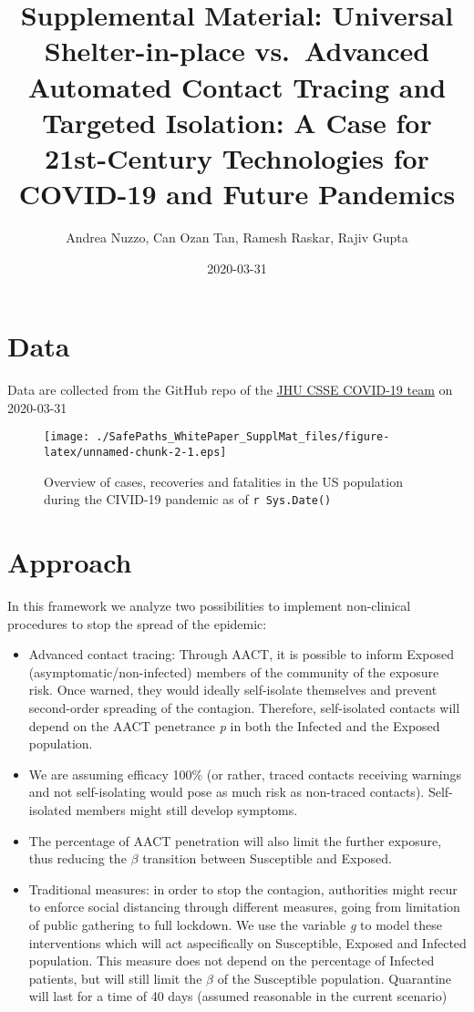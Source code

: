 \documentclass[]{article}
\title{Supplemental Material: Universal Shelter-in-place vs.~Advanced
Automated Contact Tracing and Targeted Isolation: A Case for
21st-Century Technologies for COVID-19 and Future Pandemics}
\author{Andrea Nuzzo, Can Ozan Tan, Ramesh Raskar, Rajiv Gupta}
\date{2020-03-31}
\begin{document}
\maketitle

\hypertarget{data}{%
\section{Data}\label{data}}

Data are collected from the GitHub repo of the
\href{https://doi.org/10.1016/S1473-3099(20)30120-1}{JHU CSSE COVID-19
team} on 2020-03-31

\begin{figure}
\centering
\texttt{[image: ./SafePaths\_WhitePaper\_SupplMat\_files/figure-latex/unnamed-chunk-2-1.eps]}
\caption{Overview of cases, recoveries and fatalities in the US
population during the CIVID-19 pandemic as of \texttt{r\ Sys.Date()}}
\end{figure}

\hypertarget{approach}{%
\section{Approach}\label{approach}}

In this framework we analyze two possibilities to implement non-clinical
procedures to stop the spread of the epidemic:

\begin{itemize}
\item
  Advanced contact tracing: Through AACT, it is possible to inform
  Exposed (asymptomatic/non-infected) members of the community of the
  exposure risk. Once warned, they would ideally self-isolate themselves
  and prevent second-order spreading of the contagion. Therefore,
  self-isolated contacts will depend on the AACT penetrance \emph{p} in
  both the Infected and the Exposed population.
\item
  We are assuming efficacy 100\% (or rather, traced contacts receiving
  warnings and not self-isolating would pose as much risk as non-traced
  contacts). Self-isolated members might still develop symptoms.
\item
  The percentage of AACT penetration will also limit the further
  exposure, thus reducing the \(\beta\) transition between Susceptible
  and Exposed.
\item
  Traditional measures: in order to stop the contagion, authorities
  might recur to enforce social distancing through different measures,
  going from limitation of public gathering to full lockdown. We use the
  variable \emph{g} to model these interventions which will act
  aspecifically on Susceptible, Exposed and Infected population. This
  measure does not depend on the percentage of Infected patients, but
  will still limit the \(\beta\) of the Susceptible population.
  Quarantine will last for a time of 40 days (assumed reasonable in the
  current scenario)
\end{itemize}
\end{document}
